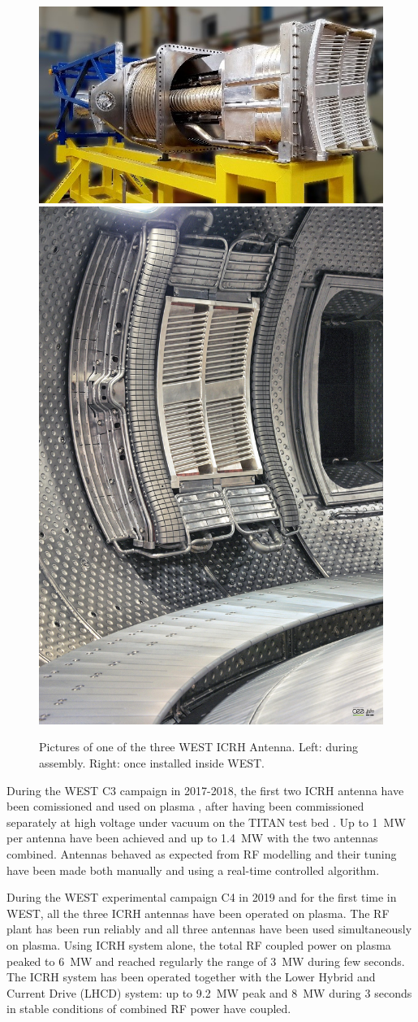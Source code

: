 {\begin{figure}
	\centering
	\includegraphics[width=0.69\linewidth]{figures/chap3/WEST_ICRH/WEST_ICRH_antenna_picture}	\includegraphics[width=0.29\linewidth]{figures/chap3/WEST_ICRH/WEST_ICRH_antenna_inside_WEST}
	\caption{Pictures of one of the three WEST ICRH Antenna. Left: during assembly. Right: once installed inside WEST.}
	\label{fig:westicrhantennapicture}
\end{figure}

During the WEST C3 campaign in 2017-2018, the first two ICRH antenna have been comissioned and used on plasma , after having been commissioned separately at high voltage under vacuum on the TITAN test bed . Up to 1~MW per antenna have been achieved and up to 1.4~MW with the two antennas combined. Antennas behaved as expected from RF modelling and their tuning have been made both manually and using a real-time controlled algorithm. 

During the WEST experimental campaign C4 in 2019 and for the first time in WEST, all the three ICRH antennas have been operated on plasma. The RF plant has been run reliably and all three antennas have been used simultaneously on plasma. Using ICRH system alone, the total RF coupled power on plasma peaked to 6~MW and reached regularly the range of 3~MW during few seconds. The ICRH system has been operated together with the Lower Hybrid and Current Drive (LHCD) system: up to 9.2~MW peak and 8~MW during 3 seconds in stable conditions of combined RF power have coupled.

}
